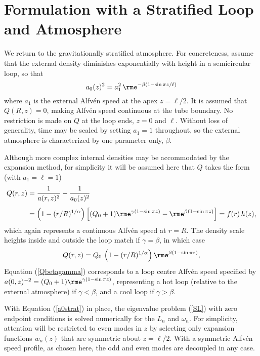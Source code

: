 \documentclass[12pt]{iopart}
\renewcommand{\L}{{\ell}}
\begin{document}
\section{Formulation with a Stratified Loop and Atmosphere}\label{Sec:strat}
We return to the gravitationally stratified atmosphere. For concreteness, assume that the external density diminishes exponentially with height in a semicircular loop, so that
\begin{equation}
a_0(z)^2 = a_1^2 \,\rme^{-\beta(1-\sin\pi z/\L)}  \label{a0strat}
\end{equation}
where $a_1$ is the external Alfv\'en speed at the apex $z=\L/2$. It is assumed that $Q(R,z)=0$, making Alfv\'en speed continuous at the tube boundary. No restriction is made on $Q$ at the loop ends, $z=0$ and $\L$. Without loss of generality, time may be scaled by setting $a_1=1$ throughout, so the external atmosphere is characterized by one parameter only, $\beta$. 

Although more complex internal densities may be accommodated by the expansion method, for simplicity it will be assumed here that $Q$ takes the form (with $a_1=\L=1$)
\begin{equation}\label{Qbetagamma}
\begin{split}
Q(r,z) &= \frac{1}{a(r,z)^2}-\frac{1}{a_0(z)^2}\\[4pt]
&=\left(1-(r/R)^{1/\alpha}\right)
\left[
(Q_0+1) \rme^{\gamma(1-\sin\pi z)}-\rme^{\beta(1-\sin\pi z)}
\right] = f(r)\,h(z)
,  
\end{split}
\end{equation}
which again represents a continuous Alfv\'en speed at $r=R$. The density scale heights inside and outside the loop match if $\gamma=\beta$, in which case
\begin{equation}
Q(r,z) =  Q_0\,\left(1-(r/R)^{1/\alpha}\right)
\rme^{\beta(1-\sin\pi z)}
,  \label{Qbeta}
\end{equation}
Equation (\ref{Qbetagamma}) corresponds to a loop centre Alfv\'en speed specified by $a(0,z)^{-2}=(Q_0+1) \rme^{\gamma(1-\sin\pi z)}$, representing a hot loop (relative to the external atmosphere) if $\gamma<\beta$, and a cool loop if $\gamma>\beta$.

With Equation (\ref{a0strat}) in place, the eigenvalue problem (\ref{SL}) with zero endpoint conditions is solved numerically for the $L_n$ and $\omega_n$. {For simplicity, attention will be restricted to even modes in $z$ by selecting only expansion functions $w_n(z)$ that are symmetric about $z=\ell/2$. With a symmetric Alfv\'en speed profile, as chosen here, the odd and even modes are decoupled in any case.}
\end{document}
